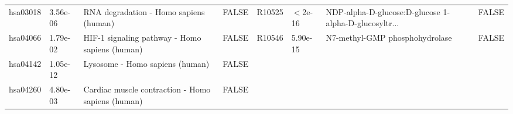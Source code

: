 \documentclass{article}\usepackage[]{graphicx}\usepackage[]{color}
\begin{document}
{{\begin{tabular}{llllllll}
  hsa03018 &  3.56e-06 & RNA degradation - Homo sapiens (human) & FALSE & R10525 & $<$2e-16 & NDP-alpha-D-glucose:D-glucose 1-alpha-D-glucosyltr... & FALSE \\ 
  hsa04066 &  1.79e-02 & HIF-1 signaling pathway - Homo sapiens (human) & FALSE & R10546 &  5.90e-15 & N7-methyl-GMP phosphohydrolase & FALSE \\ 
  hsa04142 &  1.05e-12 & Lysosome - Homo sapiens (human) & FALSE &  &  &  &  \\ 
  hsa04260 &  4.80e-03 & Cardiac muscle contraction - Homo sapiens (human) & FALSE &  &  &  &  \\ 
   \hline
\end{tabular}
}

}

\end{document}
